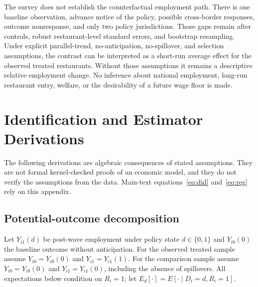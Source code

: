 \documentclass[11pt]{article}
\begin{document}
The survey does not establish the counterfactual employment path. There is one baseline observation, advance notice of the policy, possible cross-border responses, outcome nonresponse, and only two policy jurisdictions. Those gaps remain after controls, robust restaurant-level standard errors, and bootstrap resampling. Under explicit parallel-trend, no-anticipation, no-spillover, and selection assumptions, the contrast can be interpreted as a short-run average effect for the observed treated restaurants. Without those assumptions it remains a descriptive relative employment change. No inference about national employment, long-run restaurant entry, welfare, or the desirability of a future wage floor is made. %

\appendix
\section{Identification and Estimator Derivations}\label{app:derivation}
The following derivations are algebraic consequences of stated assumptions. They are not formal kernel-checked proofs of an economic model, and they do not verify the assumptions from the data. Main-text equations~\eqref{eq:did} and~\eqref{eq:reg} rely on this appendix. %

\subsection{Potential-outcome decomposition}
Let $Y_{i1}(d)$ be post-wave employment under policy state $d\in\{0,1\}$ and $Y_{i0}(0)$ the baseline outcome without anticipation. For the observed treated sample assume $Y_{i0}=Y_{i0}(0)$ and $Y_{i1}=Y_{i1}(1)$. For the comparison sample assume $Y_{i0}=Y_{i0}(0)$ and $Y_{i1}=Y_{i1}(0)$, including the absence of spillovers. All expectations below condition on $R_i=1$; let $E_d[\cdot]=E[\cdot\mid D_i=d,R_i=1]$. %
\end{document}
